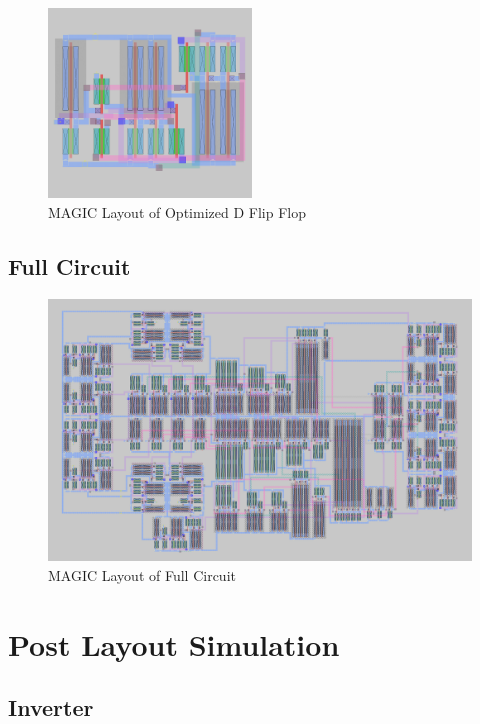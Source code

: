 \documentclass[conference]{IEEEtran}
\begin{document}
\begin{figure}[H]
    \centering
    \includegraphics[width=0.48\textwidth]{images/d_ff_optimized_layout.png}
    \caption{MAGIC Layout of Optimized D Flip Flop}
\end{figure}


\subsection{Full Circuit}

\begin{figure}[t]
    \centering
    \includegraphics[width=1\textwidth]{images/full_optimized_layout.png}
    \caption{MAGIC Layout of Full Circuit}
\end{figure}

\section{Post Layout Simulation}

\subsection{Inverter}
\end{document}
